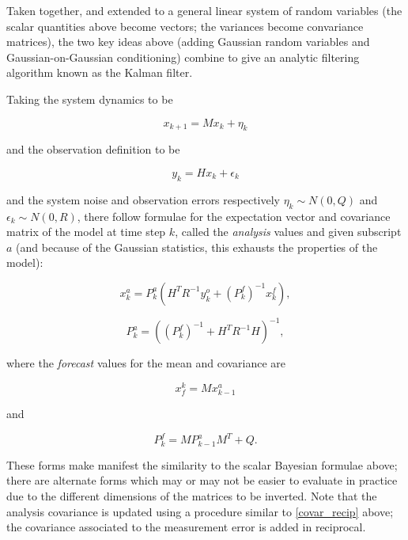 Taken together, and extended to a general linear system of random variables (the scalar quantities above become vectors; the variances become convariance matrices), the two key ideas above (adding Gaussian random variables and Gaussian-on-Gaussian conditioning) combine to give an analytic filtering algorithm known as the Kalman filter.

Taking the system dynamics to be

\begin{equation}
x_{k+1} = M x_{k}+\eta_k
\end{equation}

and the observation definition to be

\begin{equation}
y_{k} = H x_{k}+\epsilon_k
\end{equation}

and the system noise and observation errors respectively $\eta_k \sim N(0, Q)$ and $\epsilon_k \sim N(0, R)$, there follow formulae for the expectation vector and covariance matrix of the model at time step $k$, called the {\it analysis} values and given subscript $a$ (and because of the Gaussian statistics, this exhausts the properties of the model):

\begin{equation}
x_k^a = P_k^a \left ( H^T R^{-1} y_k^o + \left ( P_k^f \right )^{-1} x_k^f \right ),
\end{equation}

\begin{equation}
P_k^a = \left ( \left ( P_k^f\right )^{-1} + H^T R^{-1} H \right )^{-1},
\end{equation}

where the {\it forecast} values for the mean and covariance are

\begin{equation}
x_f^k = M x_{k-1}^a
\end{equation}

and

\begin{equation}
P_k^f = M P_{k-1}^a M^T + Q.
\end{equation}

These forms make manifest the similarity to the scalar Bayesian formulae above; there are alternate forms which may or may not be easier to evaluate in practice due to the different dimensions of the matrices to be inverted.  
Note that the analysis covariance is updated using a procedure similar to \ref{covar_recip} above; the covariance associated to the measurement error is added in reciprocal.

